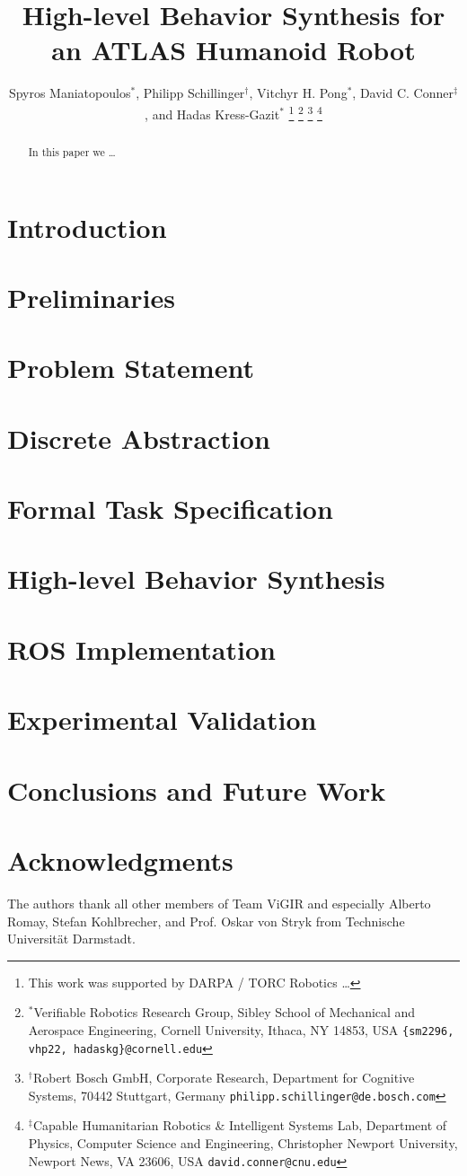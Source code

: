 \documentclass[letterpaper, 10 pt, conference]{ieeeconf}	%
\title{\LARGE \bf
	High-level Behavior Synthesis for an ATLAS Humanoid Robot
}
\author{Spyros Maniatopoulos$^{*}$, Philipp Schillinger$^{\dagger}$, Vitchyr H. Pong$^{*}$, David C. Conner$^{\ddagger}$, and Hadas Kress-Gazit$^{*}$%
\thanks{This work was supported by DARPA / TORC Robotics \ldots}
\thanks{$^{*}$Verifiable Robotics Research Group, Sibley School of Mechanical and Aerospace Engineering, Cornell University, Ithaca, NY 14853, USA {\tt \{sm2296, vhp22, hadaskg\}\nolinkurl{@cornell.edu}}}
\thanks{$^{\dagger}$Robert Bosch GmbH, Corporate Research, Department for Cognitive Systems, 70442 Stuttgart, Germany {\tt philipp.schillinger\nolinkurl{@de.bosch.com}}}
\thanks{$^{\ddagger}$Capable Humanitarian Robotics \& Intelligent Systems Lab, Department of Physics, Computer Science and Engineering, Christopher Newport University, Newport News, VA 23606, USA {\tt david.conner\nolinkurl{@cnu.edu}}}
}%
\begin{document}
%
\maketitle
\thispagestyle{empty}
\pagestyle{empty}
%
\begin{abstract}
In this paper we \ldots
{}
\end{abstract}
%
%
\newpage
%
%
\section{Introduction}\label{S:intro}

%
\section{Preliminaries}\label{S:prelim}

%
\section{Problem Statement}\label{S:problem}

%
\section{Discrete Abstraction}\label{S:abstraction}

%
\section{Formal Task Specification}\label{S:ltl}

%
\section{High-level Behavior Synthesis}\label{S:synthesis}

%
\section{ROS Implementation}\label{S:implementation}

%
\section{Experimental Validation}\label{S:experiments}

%
\section{Conclusions and Future Work}\label{S:conclusion}

%
\section*{Acknowledgments}
The authors thank all other members of Team ViGIR and especially Alberto Romay, Stefan Kohlbrecher, and Prof. Oskar von Stryk from Technische Universit\"{a}t Darmstadt.
%
%


%
\end{document}
